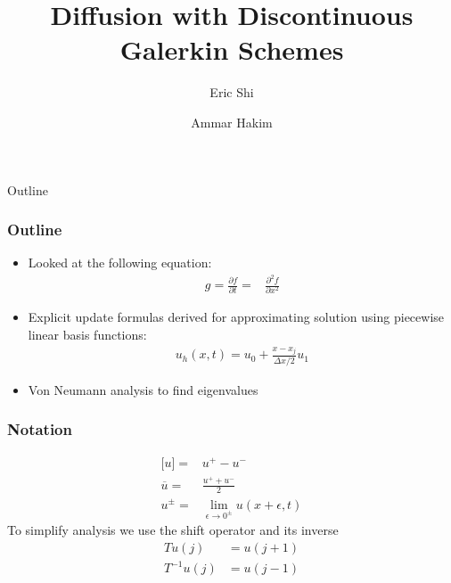 \documentclass[serif,12pt]{beamer}
\title{Diffusion with Discontinuous Galerkin Schemes}
\author{Eric Shi \and Ammar Hakim}
\date{}
\institute[http://www.ammar-hakim.org/sj] %
{
  Princeton Plasma Physics Laboratory, Princeton, NJ
}
\begin{document}
\begin{frame}
  \titlepage
\end{frame}

\begin{frame}{Outline}
  \tableofcontents
\end{frame}

\begin{frame}
  \frametitle{Outline}
  \begin{itemize}
  \item Looked at the following equation:
    \begin{align*}
      g = \frac{\partial f}{\partial t}=& \frac{\partial^2 f}{\partial x^2}
    \end{align*}
  \item Explicit update formulas derived for approximating solution
    using piecewise linear basis functions:
    \begin{align*}
      u_h(x,t) = u_0 + \frac{x-x_j}{\Delta x / 2} u_1
    \end{align*}
  \item Von Neumann analysis to find eigenvalues
  \end{itemize}
\end{frame}

\begin{frame}
  \frametitle{Notation}
  \begin{align*}
    \lbrack u \rbrack = & u^+ - u^-\\
    \overline{u} = & \frac{u^+ + u^-}{2}\\
    u^{\pm} = & \lim_{\epsilon \to 0^\pm} u(x+\epsilon,t)
  \end{align*}
  To simplify analysis we use the shift operator and its inverse
  \begin{align*}
    T u(j) &= u(j+1) \\
    T^{-1} u(j) &= u(j-1)
  \end{align*}
\end{frame}
\end{document}
